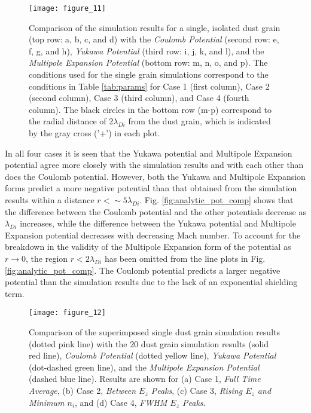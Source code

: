 \documentclass[aip,amsmath,amssymb,graphicx,floatfix,reprint]{revtex4-1}
\begin{document}
\begin{figure}
\texttt{[image: figure\_11]}
\caption{Comparison of the simulation results for a single, isolated dust grain (top row: a, b, c, and d) with the \emph{Coulomb Potential} (second row: e, f, g, and h), \emph{Yukawa Potential} (third row: i, j, k, and l), and the \emph{Multipole Expansion Potential} (bottom row: m, n, o, and p).  The conditions used for the single grain simulations correspond to the conditions in Table \ref{tab:params} for Case 1 (first column), Case 2 (second column), Case 3 (third column), and Case 4 (fourth column).  The black circles in the bottom row (m-p) correspond to the radial distance of 2$\lambda_{Di}$ from the dust grain, which is indicated by the gray cross ('+') in each plot.}
\label{fig:single_grain_grid}
\end{figure}

In all four cases it is seen that the Yukawa potential and Multipole Expansion potential agree more closely with the simulation results and with each other than does the Coulomb potential.  However, both the Yukawa and Multipole Expansion forms predict a more negative potential than that obtained from the simulation results within a distance $r<\sim 5\lambda_{Di}$.  Fig. \ref{fig:analytic_pot_comp} shows that the difference between the Coulomb potential and the other potentials decrease as $\lambda_{Di}$ increases, while the difference between the Yukawa potential and Multipole Expansion potential decreases with decreasing Mach number.  To account for the breakdown in the validity of the Multipole Expansion form of the potential as $r\rightarrow 0$, the region $r < 2\lambda_{Di}$ has been omitted from the line plots in Fig. \ref{fig:analytic_pot_comp}.  The Coulomb potential predicts a larger negative potential than the simulation results due to the lack of an exponential shielding term.

\begin{figure}
\texttt{[image: figure\_12]}
\caption{Comparison of the superimposed single dust grain simulation results (dotted pink line) with the 20 dust grain simulation results (solid red line), \emph{Coulomb Potential} (dotted yellow line), \emph{Yukawa Potential} (dot-dashed green line), and the \emph{Multipole Expansion Potential} (dashed blue line).  Results are shown for (a) Case 1, \emph{Full Time Average}, (b) Case 2, \emph{Between $E_z$ Peaks}, (c) Case 3, \emph{Rising $E_z$ and Minimum $n_i$}, and (d) Case 4, \emph{FWHM $E_z$ Peaks}.}
\label{fig:analytic_pot_comp_full_chain}
\end{figure}
\end{document}
